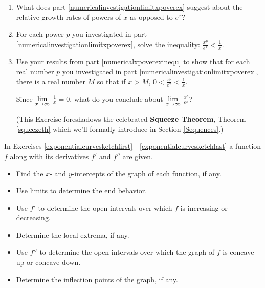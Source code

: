 \documentclass{ximera}
\begin{document}
\begin{enumerate}
\begin{enumerate}
\item  What does part \ref{numericalinvestigationlimitxpoverex} suggest about the relative growth rates of powers of $x$ as opposed to $e^{x}$?

\item\label{numericalxpoverexinequ}  For each power $p$ you investigated in part \ref{numericalinvestigationlimitxpoverex}, solve the inequality:  $\frac{x^{p}}{e^{x}} < \frac{1}{x}$. 

\item  Use your results from part \ref{numericalxpoverexinequ} to show that for each real number $p$ you investigated in part \ref{numericalinvestigationlimitxpoverex}, there is a real number $M$ so that if $x > M$, $0 < \frac{x^{p}}{e^{x}} < \frac{1}{x}$.  

\smallskip

Since  $\ds{\lim_{x \rightarrow \infty}}$ $\frac{1}{x} = 0$,  what do you conclude about $\ds{\lim_{x \rightarrow \infty}}$  $\frac{x^{p}}{e^{x}}$? 

\smallskip

 (This Exercise foreshadows the celebrated \textbf{Squeeze Theorem}, Theorem \ref{squeezeth}  which we'll formally introduce in Section \ref{Sequences}.)

\end{enumerate}  

\setcounter{HW}{\value{enumi}}
\end{enumerate}

\newpage

In Exercises \ref{exponentialcurvesketchfirst}  - \ref{exponentialcurvesketchlast} a function $f$ along with its derivatives $f'$ and $f''$ are given.

\begin{itemize}

\item  Find the $x$- and $y$-intercepts of the graph of each function, if any.

\item  Use limits to determine the end behavior.

\item  Use $f'$ to determine the open intervals over which $f$ is increasing or decreasing.

\item Determine the local extrema, if any.

\item  Use $f''$ to determine the open intervals over which the graph of $f$  is concave up or concave down.

\item  Determine the inflection points of the graph, if any.

\end{itemize}
\end{document}
